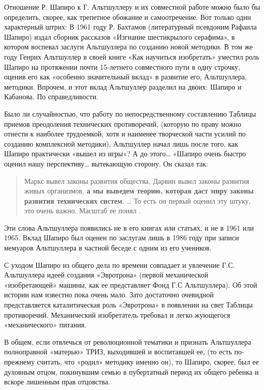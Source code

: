 \documentclass[11pt,a4paper]{article}
\begin{document}
Отношение Р. Шапиро к Г. Альтшуллеру и их совместной работе можно было бы
определить, скорее, как трепетное обожание и самоотречение. Вот только один
характерный штрих: В 1961 году Р. Бахтамов (литературный псевдоним Рафаила
Шапиро) издал сборник рассказов «Изгнание шестикрылого серафима», в котором
воспевал заслуги Альтшуллера по созданию новой методики. В том же году Генрих
Альтшуллер в своей книге «Как научиться изобретать» уместил роль Шапиро на
протяжении почти 15-летнего совместного пути в одну строчку, оценив его как
«особенно значительный вклад» в развитие его, Альтшуллера, методики. Впрочем,
и этот вклад Альтшуллер разделил на двоих: Шапиро и Кабанова. По
справедливости.

Было ли случайностью, что работу по непосредственному составлению Таблицы
приемов преодоления технических противоречий, (которую по праву можно отнести
к наиболее трудоемкой, хотя и наименее творческой части усилий по созданию
комплексной методики), Альтшуллер начал лишь после того, как Шапиро
практически «вышел из игры«? А до этого… «Шапиро очень быстро оценил нашу
перспективу… вытекающую сторону. Он сказал так: 
\begin{quote}
  Маркс вывел законы развития общества, Дарвин вывел законы развития живых
  организмов, \textbf{а мы выведем теорию, которая даст миру законы развития
    технических систем}. … То есть он первый оценил эту штуку, это очень
  важно. Масштаб ее понял \cite{Altshuller1986}.
\end{quote}
Эти слова Альтшуллера появились не в его книгах или статьях, и не в 1961 или
1965. Вклад Шапиро был оценен по заслугам лишь в 1986 году при записи мемуаров
Альтшуллера в частной беседе с одним из его учеников.

С уходом Шапиро из общего дела по времени совпадает и увлечение
Г.С. Альтшуллера идеей создания «Эвротрона» (первой механической
«изобретающей» машины, как ее представляет Фонд Г.С Альтшуллера). Об этой
истории нам известно пока очень мало. Зато достаточно очевидной представляется
каталитическая роль «Эвротрона» в появлении на свет Таблицы
противоречий. Механический изобретатель требовал и легко жующегося
«механического» питания.

В общем, если отвлечься от революционной тематики и признать Альтшуллера
полноправной «матерью» ТРИЗ, выходившей и воспитавшей ее, (то есть по-прежнему
считать, что «родил» методику именно он), то Шапиро, скорее, был ее духовным
отцом, покинувшим семью в пубертатный период их общего ребенка и вскоре
лишенным прав отцовства.
\end{document}

